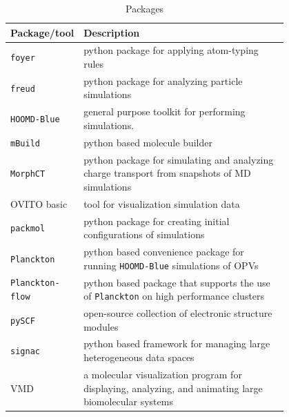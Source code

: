  

\begin{table}[]
    \caption{Packages} %
\centering %
\begin{tabular}{|l|p{0.8\linewidth}|} %
\hline\hline %
Package/tool & Description \\ [0.5ex] %
\hline %
    \texttt{foyer} & python package for applying atom-typing rules  \cite{Klein2018a}\\ [1ex] %
\texttt{freud} & python package for analyzing particle simulations  \cite{Ramasubramani2020}\\ [1ex] %
\texttt{HOOMD-Blue} & general purpose toolkit for performing simulations.   \cite{Anderson2020a}\\ [1ex] %
    \texttt{mBuild} & python based molecule builder \cite{Klein2018a}\\ [1ex] %
\texttt{MorphCT} & python package for simulating and analyzing charge transport from 
    snapshots of MD simulations \cite{jones2017}\cite{cmelab}\\[1ex] 
OVITO basic & tool for visualization simulation data \cite{Stukowski2010a}\\[1ex] 
\texttt{packmol} & python package for creating initial configurations of simulations \cite{Martinez2009}\\[1ex] 
\texttt{Planckton} & python based convenience package for running \texttt{HOOMD-Blue}
    simulations of OPVs \cite{cmelab}\\[1ex]
    \texttt{Planckton-flow} & python based package that supports the use of \texttt{Planckton} on
    high performance clusters\cite{cmelab}\\[1ex]
\texttt{pySCF} & open-source collection of electronic structure modules \cite{Sun2018a}\\[1ex]
\texttt{signac} & python based framework for managing large heterogeneous data spaces \cite{Adorf2016}\\[1ex]
VMD & a molecular visualization program for displaying, analyzing, and animating large biomolecular
    systems \cite{Humphrey1996}\\


\hline %
\end{tabular}
\label{packages} %
\end{table}

